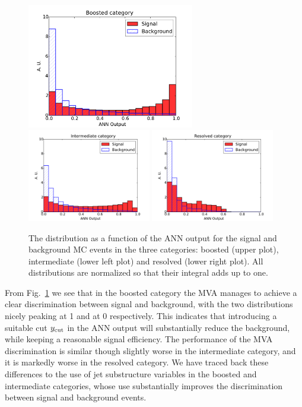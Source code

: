 \begin{figure}[t]
\begin{center}
\includegraphics[width=0.65\textwidth]{plots/Boosted_disc.pdf}
\includegraphics[width=0.48\textwidth]{plots/Intermediate_disc.pdf}
\includegraphics[width=0.48\textwidth]{plots/Resolved_disc.pdf}
\caption{\small The distribution as a function of the ANN output
  for the signal and background MC events in the three categories:
  boosted (upper plot), intermediate (lower left plot) and
  resolved (lower right plot).
  All distributions are normalized so that their integral
  adds up to one.
}
\label{fig:nnresponse}
\end{center}
\end{figure}

From Fig.~\ref{fig:nnresponse} we see that in the boosted category the MVA manages
to achieve a clear discrimination between signal and background, with the two distributions
nicely peaking at 1 and at 0 respectively.
%
This indicates that introducing a suitable cut
$y_{\rm cut}$
in the ANN output will substantially reduce the background,
while keeping a reasonable signal efficiency.
%
The performance of the MVA discrimination is similar though slightly worse in the intermediate
category, and it is markedly worse in the resolved category.
%
We have traced back these differences to the use of jet substructure variables
in the boosted and intermediate categories, whose use substantially
improves the
discrimination between signal and background events.




